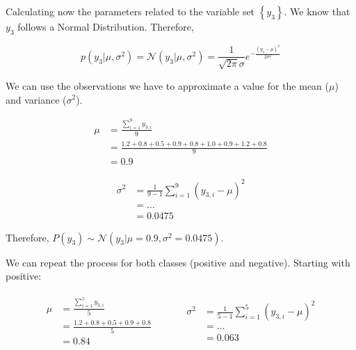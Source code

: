 \documentclass[12pt]{article}
\begin{document}
\begin{enumerate}[leftmargin=\labelsep,resume]
          Calculating now the parameters related to the variable set $\left\{y_3\right\}$. We know that $y_3$ follows a Normal Distribution.
          Therefore,

          \begin{equation}\label{ex2-normal}
              p\left(y_3 | \mu, \sigma^2\right)
              = \mathcal{N}\left(y_3 | \mu, \sigma^2\right)
              = \frac{1}{\sqrt{2 \pi} \sigma} e ^{- \frac{\left(y_3- \mu\right)^2}{2 \sigma^2}}
          \end{equation}

          We can use the observations we have to approximate a value for the
          mean ($\mu$) and variance ($\sigma^2$).

          $$
              \begin{aligned}
                  \mu & = \frac{\sum^{9}_{i=1} y_{3,i}}{9}                              \\
                      & = \frac{1.2 + 0.8 + 0.5 + 0.9 + 0.8 + 1.0 + 0.9 + 1.2 + 0.8}{9} \\
                      & = 0.9
              \end{aligned}
          $$

          $$
              \begin{aligned}
                  \sigma^2 & = \frac{1}{9 - 1} \sum^9_{i=1} \left(y_{3,i} - \mu\right)^2 \\
                           & = \dots                                                     \\
                           & = 0.0475
              \end{aligned}
          $$

          Therefore, $P(y_3) \sim \mathcal{N}(y_3 | \mu = 0.9, \sigma^2 = 0.0475)$.

          We can repeat the process for both classes (positive and negative).
          Starting with positive:

          $$
              \begin{array}{c|c}
                  \begin{aligned}
                      \mu & = \frac{\sum^{5}_{i=1} y_{3,i}}{5}      \\
                          & = \frac{1.2 + 0.8 + 0.5 + 0.9 + 0.8}{5} \\
                          & = 0.84
                  \end{aligned}
                  \quad &
                  \quad
                  \begin{aligned}
                      \sigma^2 & = \frac{1}{5 - 1} \sum^5_{i=1} \left(y_{3,i} - \mu\right)^2 \\
                               & = \dots                                                     \\
                               & = 0.063
                  \end{aligned}
              \end{array}
          $$


\end{enumerate}
\end{document}
